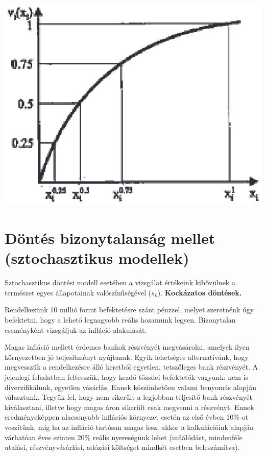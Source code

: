 \documentclass[a4paper,12pt]{article}
\begin{document}
\begin{center}

\includegraphics[scale=0.7]{valuesample}
\\
\end{center}


\section{Döntés bizonytalanság mellet (sztochasztikus modellek)}

Sztochasztikus döntési modell esetében a vizsgálat értékeink kibővülnek a természet egyes állapotainak valószínűségével ($s_k$). \textbf{Kockázatos döntések.}

Rendelkezünk 10 millió forint befektetésre szánt pénzzel, melyet szeretnénk úgy befektetni, hogy a lehető legnagyobb reális hozamunk legyen. Bizonytalan eseményként vizsgáljuk az infláció alakulását.

Magas infláció mellett érdemes bankok részvényét megvásárolni, amelyek ilyen környezetben jó teljesítményt nyújtanak. Egyik lehetséges alternatívánk, hogy megvesszük a rendelkezésre álló keretből egyetlen, tetszőleges bank részvényét. A jelenlegi feladatban feltesszük, hogy kezdő tőzsdei befektetők vagyunk: nem is diverzifikálunk, egyetlen vásárlás. Ennek köszönhetően valami benyomás alapján választunk. Tegyük fel, hogy nem sikerült a legjobban teljesítő bank részvényét kiválasztani, illetve hogy magas áron sikerült csak megvenni a részvényt. Ennek eredményeképpen alacsonyabb inflációs környezet esetén az első évben 10$\%$-ot veszítünk, míg ha az infláció tartósan magas lesz, akkor a kalkulációink alapján várhatóan éves szinten 20$\%$ reális nyereségünk lehet (inflálódást, mindenféle utalási, részvényvásárlási, adózási költséget mindkét esetben beleszámítva).
\end{document}
